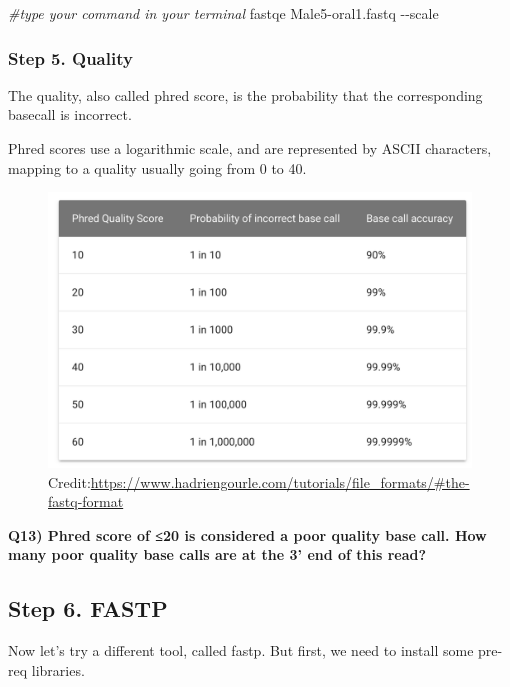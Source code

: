 \documentclass[
]{article}
\newenvironment{Shaded}{\begin{snugshade}}{\end{snugshade}}
\newcommand{\AttributeTok}[1]{\textcolor[rgb]{0.77,0.63,0.00}{#1}}
\newcommand{\CommentTok}[1]{\textcolor[rgb]{0.56,0.35,0.01}{\textit{#1}}}
\newcommand{\ExtensionTok}[1]{#1}
\newcommand{\NormalTok}[1]{#1}
\begin{document}
\begin{Shaded}
\begin{Highlighting}[]
\CommentTok{\#type your command in your terminal}
\ExtensionTok{fastqe}\NormalTok{ Male5{-}oral1.fastq }\AttributeTok{{-}{-}scale}
\end{Highlighting}
\end{Shaded}

\hypertarget{step-5.-quality}{%
\subsubsection{Step 5. Quality}\label{step-5.-quality}}

The quality, also called phred score, is the probability that the
corresponding basecall is incorrect.

Phred scores use a logarithmic scale, and are represented by ASCII
characters, mapping to a quality usually going from 0 to 40.

\begin{figure}
\centering
\includegraphics{images/phred.png}
\caption{Credit:\url{https://www.hadriengourle.com/tutorials/file_formats/\#the-fastq-format}}
\end{figure}

\textbf{Q13) Phred score of ≤20 is considered a poor quality base call.
How many poor quality base calls are at the 3' end of this read?}

\hypertarget{step-6.-fastp}{%
\subsection{Step 6. FASTP}\label{step-6.-fastp}}

Now let's try a different tool, called fastp. But first, we need to
install some pre-req libraries.
\end{document}
